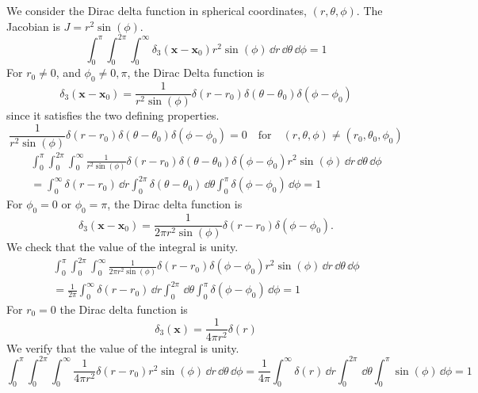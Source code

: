 {\begin{Solution}
  \label{solution dirac delta spherical}
  We consider the Dirac delta function in spherical coordinates, $(r, \theta, \phi)$.
  The Jacobian is $J = r^2 \sin(\phi)$.
  \[
  \int_0^\pi \int_0^{2 \pi} \int_0^\infty \delta_3 \left( \mathbf{x} - \mathbf{x}_0 \right) 
  r^2 \sin(\phi) \,\dd r \,\dd \theta \,\dd \phi = 1
  \]
  For $r_0 \neq 0$, and $\phi_0 \neq 0,\pi$, the Dirac Delta function is
  \[
  \delta_3 \left( \mathbf{x} - \mathbf{x}_0 \right) 
  = \frac{1}{r^2 \sin(\phi)} \delta \left( r - r_0 \right) \delta \left( \theta - \theta_0 \right)
  \delta \left( \phi - \phi_0 \right)
  \]
  since it satisfies the two defining properties.
  \[
  \frac{1}{r^2 \sin(\phi)} \delta \left( r - r_0 \right) \delta \left( \theta - \theta_0 \right)
  \delta \left( \phi - \phi_0 \right) = 0 
  \quad \mathrm{for} \quad ( r, \theta, \phi ) \neq \left( r_0, \theta_0, \phi_0 \right)
  \]
  \begin{multline*}
    \int_0^\pi \int_0^{2 \pi} \int_0^\infty \frac{1}{r^2 \sin(\phi)} 
    \delta \left( r - r_0 \right) \delta \left( \theta - \theta_0 \right) \delta \left( \phi - \phi_0 \right)
    r^2 \sin(\phi) \,\dd r \,\dd \theta \,\dd \phi
    \\
    = \int_0^\infty \delta \left( r - r_0 \right) \,\dd r 
    \int_0^{2 \pi} \delta \left( \theta - \theta_0 \right) \,\dd \theta 
    \int_0^\pi \delta \left( \phi - \phi_0 \right) \,\dd \phi = 1
  \end{multline*}
  For $\phi_0 = 0$ or $\phi_0 = \pi$, the Dirac delta function is
  \[
  \delta_3 \left( \mathbf{x} - \mathbf{x}_0 \right) 
  = \frac{1}{2 \pi r^2 \sin(\phi)} \delta \left( r - r_0 \right) \delta \left( \phi - \phi_0 \right).
  \]
  We check that the value of the integral is unity.
  \begin{multline*}
    \int_0^\pi \int_0^{2 \pi} \int_0^\infty \frac{1}{2 \pi r^2 \sin(\phi)} 
    \delta \left( r - r_0 \right) \delta \left( \phi - \phi_0 \right)
    r^2 \sin(\phi) \,\dd r \,\dd \theta \,\dd \phi
    \\
    = \frac{1}{2 \pi} \int_0^\infty \delta \left( r - r_0 \right) \,\dd r 
    \int_0^{2 \pi} \,\dd \theta 
    \int_0^\pi \delta \left( \phi - \phi_0 \right) \,\dd \phi = 1
  \end{multline*}
  For $r_0 = 0$ the Dirac delta function is
  \[
  \delta_3 \left( \mathbf{x} \right) 
  = \frac{1}{4 \pi r^2} \delta \left( r \right)
  \]
  We verify that the value of the integral is unity.
  \[
  \int_0^\pi \int_0^{2 \pi} \int_0^\infty \frac{1}{4 \pi r^2} 
  \delta \left( r - r_0 \right) r^2 \sin(\phi) \,\dd r \,\dd \theta \,\dd \phi
  = \frac{1}{4 \pi} \int_0^\infty \delta \left( r \right) \,\dd r 
  \int_0^{2 \pi} \,\dd \theta 
  \int_0^\pi \sin(\phi) \,\dd \phi = 1
  \]
\end{Solution}












\raggedbottom
}
